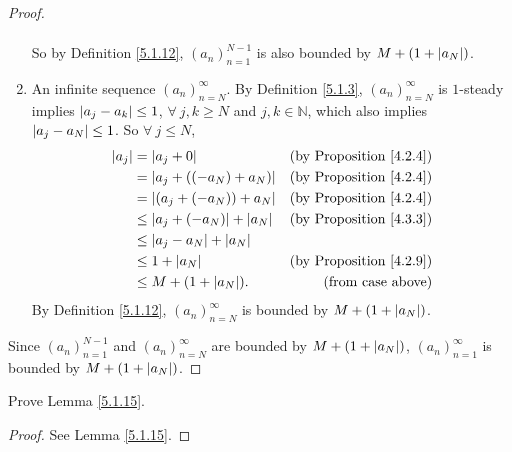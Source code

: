 \begin{proof}
\begin{enumerate}
\begin{align*}
    \end{align*}
    So by Definition \ref{5.1.12}, \((a_n)_{n = 1}^{N - 1}\) is also bounded by \(M + (1 + \abs*{a_N})\).
    \item An infinite sequence \((a_n)_{n = N}^{\infty}\).
    By Definition \ref{5.1.3}, \((a_n)_{n = N}^{\infty}\) is \(1\)-steady implies \(\abs*{a_j - a_k} \leq 1\), \(\forall\ j, k \geq N\) and  \(j, k \in \mathds{N}\), which also implies \(\abs*{a_j - a_N} \leq 1\).
    So \(\forall\ j \leq N\),
    \begin{align*}
    \abs*{a_j} &= \abs*{a_j + 0} & \text{(by Proposition \ref{4.2.4})} \\
    &= \abs*{a_j + ((-a_N) + a_N)} & \text{(by Proposition \ref{4.2.4})} \\
    &= \abs*{(a_j + (-a_N)) + a_N} & \text{(by Proposition \ref{4.2.4})} \\
    &\leq \abs*{a_j + (-a_N)} + \abs*{a_N} & \text{(by Proposition \ref{4.3.3})} \\
    &\leq \abs*{a_j - a_N} + \abs*{a_N} \\
    &\leq 1 + \abs*{a_N} & \text{(by Proposition \ref{4.2.9})} \\
    &\leq M + (1 + \abs*{a_N}). & \text{(from case above)}
    \end{align*}
    By Definition \ref{5.1.12}, \((a_n)_{n = N}^{\infty}\) is bounded by \(M + (1 + \abs*{a_N})\).
\end{enumerate}
Since \((a_n)_{n = 1}^{N - 1}\) and \((a_n)_{n = N}^{\infty}\) are bounded by \(M + (1 + \abs*{a_N})\), \((a_n)_{n = 1}^{\infty}\) is bounded by \(M + (1 + \abs*{a_N})\).
\end{proof}

\exercisesection

\begin{exercise}\label{ex 5.1.1}
Prove Lemma \ref{5.1.15}.
\end{exercise}

\begin{proof}
See Lemma \ref{5.1.15}.
\end{proof}